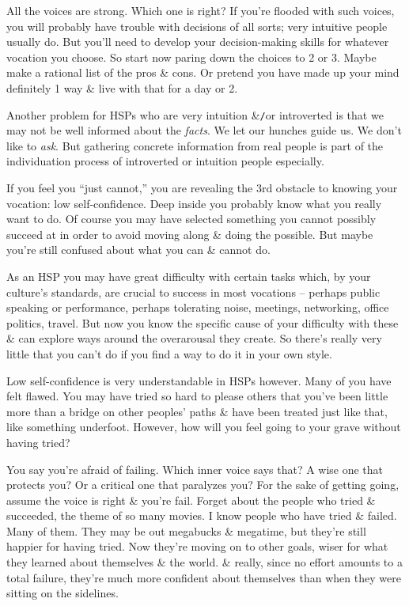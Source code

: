 \documentclass{article}
\numberwithin{equation}{section}
\begin{document}
All the voices are strong. Which one is right? If you're flooded with such voices, you will probably have trouble with decisions of all sorts; very intuitive people usually do. But you'll need to develop your decision-making skills for whatever vocation you choose. So start now paring down the choices to 2 or 3. Maybe make a rational list of the pros \& cons. Or pretend you have made up your mind definitely 1 way \& live with that for a day or 2.

Another problem for HSPs who are very intuition \&{\tt/}or introverted is that we may not be well informed about the \textit{facts}. We let our hunches guide us. We don't like to \textit{ask}. But gathering concrete information from real people is part of the individuation process of introverted or intuition people especially.

If you feel you ``just cannot,'' you are revealing the 3rd obstacle to knowing your vocation: low self-confidence. Deep inside you probably know what you really want to do. Of course you may have selected something you cannot possibly succeed at in order to avoid moving along \& doing the possible. But maybe you're still confused about what you can \& cannot do.

As an HSP you may have great difficulty with certain tasks which, by your culture's standards, are crucial to success in most vocations -- perhaps public speaking or performance, perhaps tolerating noise, meetings, networking, office politics, travel. But now you know the specific cause of your difficulty with these \& can explore ways around the overarousal they create. So there's really very little that you can't do if you find a way to do it in your own style.

Low self-confidence is very understandable in HSPs however. Many of you have felt flawed. You may have tried so hard to please others that you've been little more than a bridge on other peoples' paths \& have been treated just like that, like something underfoot. However, how will you feel going to your grave without having tried?

You say you're afraid of failing. Which inner voice says that? A wise one that protects you? Or a critical one that paralyzes you? For the sake of getting going, assume the voice is right \& you're fail. Forget about the people who tried \& succeeded, the theme of so many movies. I know people who have tried \& failed. Many of them. They may be out megabucks \& megatime, but they're still happier for having tried. Now they're moving on to other goals, wiser for what they learned about themselves \& the world. \& really, since no effort amounts to a total failure, they're much more confident about themselves than when they were sitting on the sidelines.
\end{document}
